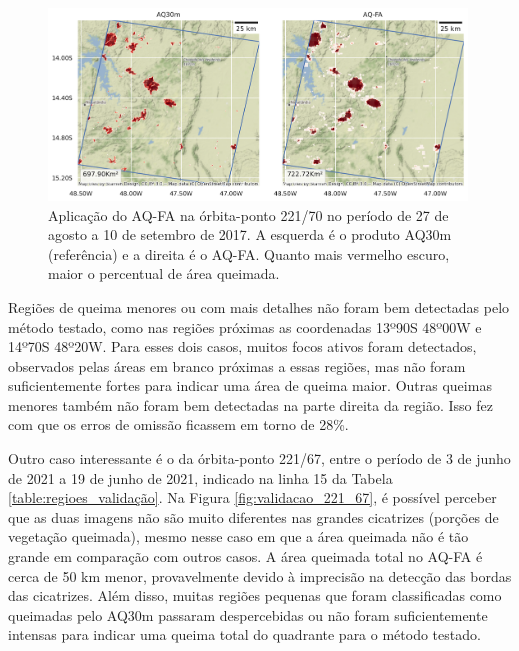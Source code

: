\documentclass[cic,tc]{iiufrgs}
\begin{document}
\begin{figure}[!htb]
    \caption{Aplicação do AQ-FA na órbita-ponto 221/70 no período de 27 de agosto a 10 de setembro de 2017. A esquerda é o produto AQ30m (referência) e a direita é o AQ-FA. Quanto mais vermelho escuro, maior o percentual de área queimada.}
    \begin{center}
        \includegraphics[width=30em]{validacao_AQ30m_221_70}
    \end{center}
    \label{fig:validacao_221_70}
\end{figure}

Regiões de queima menores ou com mais detalhes não foram bem detectadas pelo método testado, como nas regiões próximas as coordenadas 13º90\textquotesingle S 48º00\textquotesingle W e 14º70\textquotesingle S 48º20\textquotesingle W. Para esses dois casos, muitos focos ativos foram detectados, observados pelas áreas em branco próximas a essas regiões, mas não foram suficientemente fortes para indicar uma área de queima maior. Outras queimas menores também não foram bem detectadas na parte direita da região. Isso fez com que os erros de omissão ficassem em torno de 28\%.

Outro caso interessante é o da órbita-ponto 221/67, entre o período de 3 de junho de 2021 a 19 de junho de 2021, indicado na linha 15 da Tabela \ref{table:regioes_validação}. Na Figura \ref{fig:validacao_221_67}, é possível perceber que as duas imagens não são muito diferentes nas grandes cicatrizes (porções de vegetação queimada), mesmo nesse caso em que a área queimada não é tão grande em comparação com outros casos. A área queimada total no AQ-FA é cerca de 50 km menor, provavelmente devido à imprecisão na detecção das bordas das cicatrizes. Além disso, muitas regiões pequenas que foram classificadas como queimadas pelo AQ30m passaram despercebidas ou não foram suficientemente intensas para indicar uma queima total do quadrante para o método testado.
\end{document}
